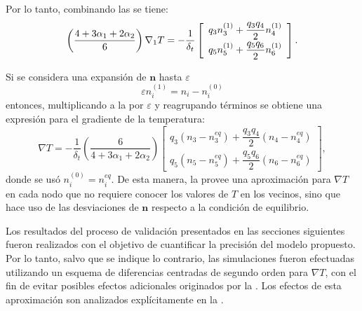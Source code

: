 Por lo tanto, combinando las  se tiene:
\begin{equation}
	\left( \dfrac{4+3\alpha_1+2\alpha_2}{6} \right) \nabla_1 T= -\dfrac{1}{\delta_t}
	\left[ 
 	\begin{array}{c} 
 		q_3 n_{3}^{(1)}  +  \dfrac{q_3q_4}{2}n_{4}^{(1)} \\[2mm]
 		q_5 n_{5}^{(1)}  +  \dfrac{q_5q_6}{2}n_{6}^{(1)}
 	\end{array} 
	\right].
	\label{eq:grad1_T}
\end{equation}

Si se considera una expansi\'on de $\bm{n}$ hasta $\varepsilon$
\begin{equation}
	\varepsilon n_i^{(1)} = n_i - n_i^{(0)}
\end{equation}
entonces, multiplicando a la  por $\varepsilon$ y reagrupando t\'erminos se obtiene una expresi\'on para el gradiente de la temperatura:
\begin{equation}
	\nabla T= -\dfrac{1}{\delta_t}\left( \dfrac{6}{4+3\alpha_1+2\alpha_2} \right)
	\left[ 
 	\begin{array}{c} 
 		q_3 (n_3 - n_3^{eq})  +  \dfrac{q_3q_4}{2} (n_4 - n_4^{eq}) \\[2mm]
 		q_5 (n_5 - n_5^{eq})  +  \dfrac{q_5q_6}{2} (n_6 - n_6^{eq})
 	\end{array} 
	\right],
	\label{eq:gradT_2d}
\end{equation}
donde se us\'o $n_i^{(0)} = n_i^{eq}$. De esta manera, la  provee una aproximaci\'on para $\nabla T$ en cada nodo que no requiere conocer los valores de $T$ en los vecinos, sino que hace uso de las desviaciones de $\bm{n}$ respecto a la condici\'on de equilibrio.

Los resultados del proceso de validaci\'on presentados en las secciones siguientes fueron realizados con el objetivo de cuantificar la precisi\'on del modelo propuesto. Por lo tanto, salvo que se indique lo contrario, las simulaciones fueron efectuadas utilizando un esquema de diferencias centradas de segundo orden para $\nabla T$, con el fin de evitar posibles efectos adicionales originados por la . Los efectos de esta aproximaci\'on son analizados expl\'icitamente en la .



